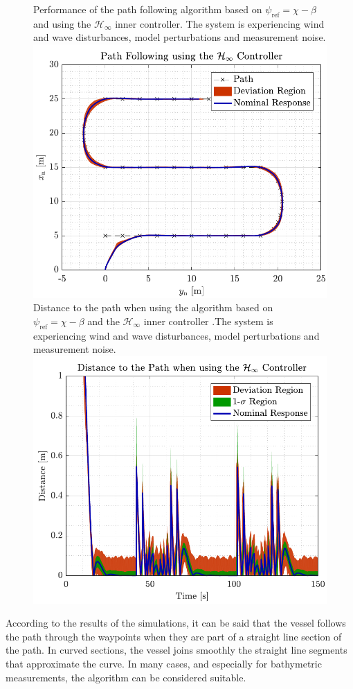 \begin{figure}[H]
	\captionbox 
	{   
		Performance of the path following algorithm based on $\psi_\mathrm{ref}=\chi-\beta$ and using the $\mathcal{H}_\infty$ inner controller. The system is experiencing wind and wave disturbances, model perturbations and measurement noise. \label{fig:robustcorrect}
	}                                                                 
	{                                                                  
		\includegraphics[width=.45\textwidth]{figures/path_rob}         
	}                                                                    
	\hspace{5pt}                                                          
	\captionbox  
	{      
			Distance to the path when using the algorithm based on $\psi_\mathrm{ref}=\chi-\beta$ and the $\mathcal{H}_\infty$ inner controller .The system is experiencing wind and wave disturbances, model perturbations and measurement noise.\label{fig:distrobustcorrect}
	}                                                                          
	{
		\includegraphics[width=.45\textwidth]{figures/dist_rob}
	}
\end{figure}
According to the results of the simulations, it can be said that the vessel follows the path through the waypoints when they are part of a straight line section of the path. In curved sections, the vessel joins smoothly the straight line segments that approximate the curve. In many cases, and especially for bathymetric measurements, the algorithm can be considered suitable.
